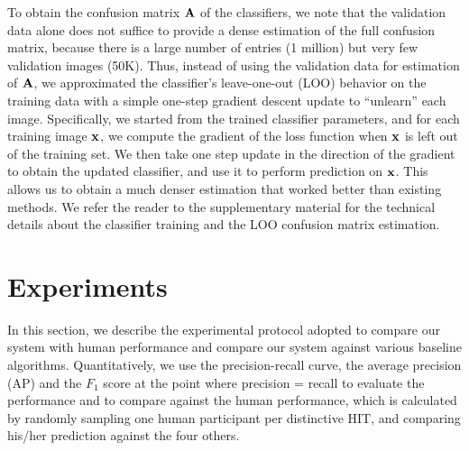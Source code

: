 To obtain the confusion matrix $\mathbf{A}$ of the classifiers, we note that the validation data alone does not suffice to provide a dense estimation of the full confusion matrix, because there is a large number of entries (1 million) but very few validation images (50K). Thus, instead of using the validation data for estimation of $\mathbf{A}$, we approximated the classifier's leave-one-out (LOO) behavior on the training data with a simple one-step gradient descent update to ``unlearn'' each image. Specifically, we started from the trained classifier parameters, and for each training image $\mathbf{x}$, we compute the gradient of the loss function when $\mathbf{x}$ is left out of the training set. We then take one step update in the direction of the gradient to obtain the updated classifier, and use it to perform prediction on $\mathbf{x}$. This allows us to obtain a much denser estimation that worked better than existing methods. We refer the reader to the supplementary material for the technical details about the classifier training and the LOO confusion matrix estimation.


\section{Experiments}
In this section, we describe the experimental protocol adopted to compare our system with human
performance and compare our system against various baseline algorithms.
Quantitatively, we use the precision-recall curve, the average precision (AP) and the $F_1$ score at the point where precision = recall 
to evaluate the performance and to compare against the human performance, which is calculated by randomly sampling one human participant per distinctive HIT, and comparing his/her prediction against the four others.

